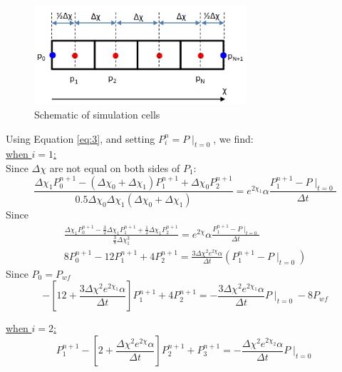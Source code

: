 \documentclass[12pt,letterpaper,titlepage]{article}
\begin{document}
\begin{figure}[h]
\centering
\includegraphics[width=0.7\textwidth]{Capture2.PNG}
\caption{\label{fig:2}Schematic of simulation cells}
\end{figure}
Using Equation \ref{eq:3}, and setting $P^n_i=P\mid_{t=0}$, we find:
\\\underline{when $i=1$:}\\
Since $\Delta\chi$ are not equal on both sides of $P_1$:
\begin{equation}
\frac{\Delta\chi_1P^{n+1}_0-(\Delta\chi_0+\Delta\chi_1)P^{n+1}_1+\Delta\chi_0P^{n+1}_2}{0.5\Delta\chi_0\Delta\chi_1(\Delta\chi_0+\Delta\chi_1)}= e^{2\chi_1}\alpha \frac{P^{n+1}_1-P\mid_{t=0}}{\Delta t}\end{equation}
Since 
\begin{gather*}
\frac{\Delta\chi_1P^{n+1}_0-\frac{3}{2}\Delta\chi_1P^{n+1}_1+\frac{1}{2}\Delta\chi_1P^{n+1}_2}{\frac{3}{8}\Delta\chi_1^3}= e^{2\chi}\alpha \frac{P^{n+1}_1-P\mid_{t=0}}{\Delta t}\\
8  P^{n+1}_0 -12 P^{n+1}_1 + 4 P^{n+1}_2= \frac{3\Delta\chi^2 e^{2\chi}\alpha}{\Delta t} (P^{n+1}_1-P\mid_{t=0})
\end{gather*}
Since $P_0=P_{wf}$
\begin{equation}\label{eq:i1}
-[12+\frac{3\Delta\chi^2 e^{2\chi_1}\alpha}{\Delta t}]P^{n+1}_1 + 4 P^{n+1}_2= -\frac{3\Delta\chi^2 e^{2\chi_1}\alpha}{\Delta t}P\mid_{t=0}-8  P_{wf} 
\end{equation}

 \underline{when $i=2$:}
\begin{equation}\label{eq:i2}
{P^{n+1}_1-[2+\frac{\Delta\chi^2e^{2\chi}\alpha}{\Delta t}]P^{n+1}_{2}+P^{n+1}_{3}} =-\frac{\Delta\chi^2e^{2\chi_2}\alpha}{\Delta t} P\mid_{t=0}
\end{equation}
\end{document}
